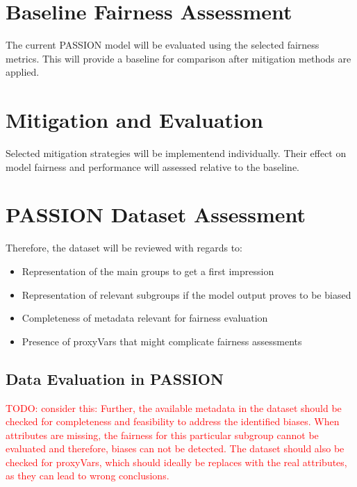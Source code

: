 \documentclass[12pt, a4paper, oneside]{book}   	%
\renewcommand{\todo}[1]{\textcolor{red}{TODO: #1}}
\begin{document}
		\section{Baseline Fairness Assessment}
		The current PASSION model will be evaluated using the selected fairness metrics. This will provide a baseline for comparison after mitigation methods are applied.
			
		\section{Mitigation and Evaluation}
		Selected mitigation strategies will be implementend individually. Their effect on model fairness and performance will assessed relative to the baseline.
		
		
		\section{PASSION Dataset Assessment}
		Therefore, the dataset will be reviewed with regards to:
		\begin{itemize}
			\item Representation of the main groups to get a first impression
			\item Representation of relevant subgroups if the model output proves to be biased
			\item Completeness of metadata relevant for fairness evaluation
			\item Presence of \glspl{proxyVar} that might complicate fairness assessments
		\end{itemize}
		
		
		
		
		
		
		
		
		
		\subsection{Data Evaluation in PASSION}
		
		
		
		\todo{consider this: 
			Further, the available metadata in the dataset should be checked for completeness and feasibility to address the identified biases. When attributes are missing, the fairness for this particular subgroup cannot be evaluated and therefore, biases can not be detected. The dataset should also be checked for \glspl{proxyVar}, which should ideally be replaces with the real attributes, as they can lead to wrong conclusions.}
		
\end{document}
